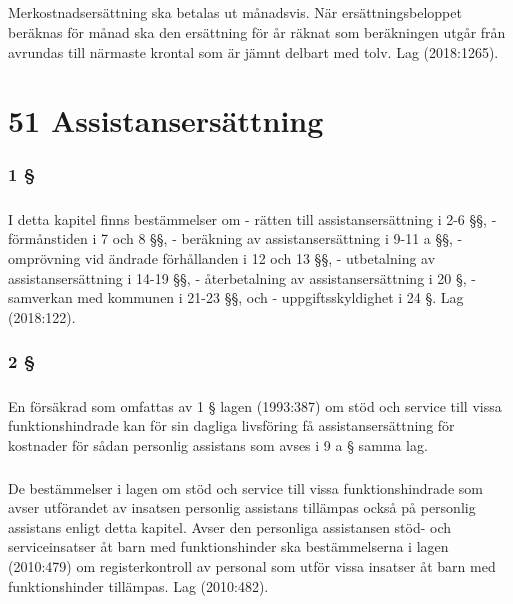 \documentclass[a4paper,notitlepage,openany,10pt]{book}
\begin{document}
\paragraph*{}
Merkostnadsersättning ska betalas ut månadsvis. När ersättningsbeloppet beräknas för månad ska den ersättning för år räknat som beräkningen utgår från avrundas till närmaste krontal som är jämnt delbart med tolv.
Lag (2018:1265).
\chapter*{51 Assistansersättning}
\subsection*{1 §}
\paragraph*{}
I detta kapitel finns bestämmelser om
\newline - rätten till assistansersättning i 2-6 §§,
\newline - förmånstiden i 7 och 8 §§,
\newline - beräkning av assistansersättning i 9-11 a §§,
\newline - omprövning vid ändrade förhållanden i 12 och 13 §§,
\newline - utbetalning av assistansersättning i 14-19 §§,
\newline - återbetalning av assistansersättning i 20 §,
\newline - samverkan med kommunen i 21-23 §§, och
\newline - uppgiftsskyldighet i 24 §.
Lag (2018:122).
\subsection*{2 §}
\paragraph*{}
En försäkrad som omfattas av 1 § lagen (1993:387) om stöd och service till vissa funktionshindrade kan för sin dagliga livsföring få assistansersättning för kostnader för sådan personlig assistans som avses i 9 a § samma lag.
\paragraph*{}
De bestämmelser i lagen om stöd och service till vissa funktionshindrade som avser utförandet av insatsen personlig assistans tillämpas också på personlig assistans enligt detta kapitel. Avser den personliga assistansen stöd- och serviceinsatser åt barn med funktionshinder ska bestämmelserna i lagen (2010:479) om registerkontroll av personal som utför vissa insatser åt barn med funktionshinder tillämpas.
Lag (2010:482).
\end{document}
